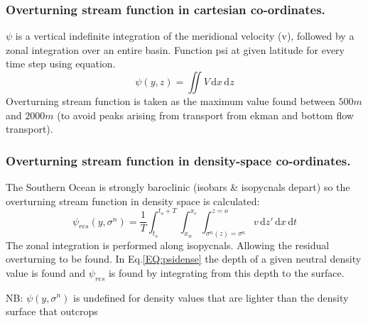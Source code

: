\subsubsection{Overturning stream function in cartesian co-ordinates.}
$\psi$ is a vertical indefinite integration of the meridional velocity (v), followed by a zonal integration over an entire basin.
Function \gls{psi} at given latitude for every time step using equation.
\begin{equation}
\psi(y, z)=\iint V\, \mathrm{d}x\, \mathrm{d}z
\end{equation} 
Overturning stream function is taken as the maximum value found between $500m$ and $2000m$ (to avoid peaks arising from transport from ekman and bottom flow transport).  
\subsubsection{Overturning stream function in density-space co-ordinates.}
The Southern Ocean is strongly baroclinic (isobars \& isopycnals depart) so the overturning stream function in density space is calculated: 
\begin{equation}
\psi_{res}(y, \sigma^n)= \frac{1}{T} \int_{t_o}^{t_{o}+T} \int_{x_{w}}^{x_e}  \int_{\sigma^n(z)=\sigma^n}^{z=o} v \,\mathrm{d}z' \,\mathrm{d}x\,\mathrm{d}t
\label{EQ:psidense} 
\end{equation} 
The zonal integration is performed along isopycnals. Allowing the residual overturning to be found.
In Eq.\ref{EQ:psidense} the depth of a given neutral density value is found and $\psi_{res}$ is found by integrating from this depth to the surface.

NB: $\psi(y,\sigma^n)$ is undefined for density values that are lighter than the density surface that outcrops
